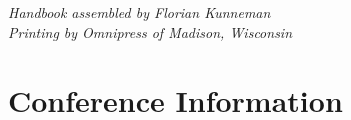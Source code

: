 \documentclass[twoside,makeidx]{book}
\begin{document}


\fancyfoot[C]{}





\cleardoublepage
\thispagestyle{empty}
\vspace*{6in}
\noindent\emph{Handbook assembled by Florian Kunneman}\\
\emph{Printing by Omnipress of Madison, Wisconsin}

\newpage
\cleardoublepage
\fancyfoot[C]{\thepage}
\frontmatter





\setcounter{tocdepth}{2}
\tableofcontents
\mainmatter
\pagestyle{fancy}


\clearpage
\setheaders{}{}
%


\chapter{Conference Information}


\clearpage


\clearpage%
\setheaders{}{}


%
\clearpage%
\setheaders{}{}


%
\clearpage
\end{document}
